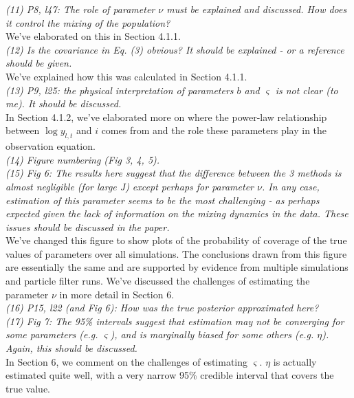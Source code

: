 \documentclass{article}
\begin{document}
\noindent \emph{(11) P8, l47: The role of parameter $\nu$ must be explained and discussed. How does it control the mixing of the population?} \\

We've elaborated on this in Section 4.1.1. \\

\noindent \emph{(12) Is the covariance in Eq. (3) obvious? It should be explained - or a reference should be given.} \\

We've explained how this was calculated in Section 4.1.1. \\

\noindent \emph{(13) P9, l25: the physical interpretation of parameters $b$ and $\varsigma$ is not clear (to me). It should be discussed.} \\

In Section 4.1.2, we've elaborated more on where the power-law relationship between $\log y_{l,t}$ and $i$ comes from and the role these parameters play in the observation equation. \\

\noindent \emph{(14) Figure numbering (Fig 3, 4, 5).} \\

\noindent \emph{(15) Fig 6: The results here suggest that the difference between the 3 methods is almost negligible (for large J) except perhaps for parameter $\nu$. In any case, estimation of this parameter seems to be the most challenging - as perhaps expected given the lack of information on the mixing dynamics in the data. These issues should be discussed in the paper.} \\

We've changed this figure to show plots of the probability of coverage of the true values of parameters over all simulations. The conclusions drawn from this figure are essentially the same and are supported by evidence from multiple simulations and particle filter runs. We've discussed the challenges of estimating the parameter $\nu$ in more detail in Section 6. \\

\noindent \emph{(16) P15, l22 (and Fig 6): How was the true posterior approximated here?} \\

\noindent \emph{(17) Fig 7: The 95\% intervals suggest that estimation may not be converging for some parameters (e.g. $\varsigma$), and is marginally biased for some others (e.g. $\eta$). Again, this should be discussed.} \\

In Section 6, we comment on the challenges of estimating $\varsigma$. $\eta$ is actually estimated quite well, with a very narrow 95\% credible interval that covers the true value. \\ 
\end{document}
